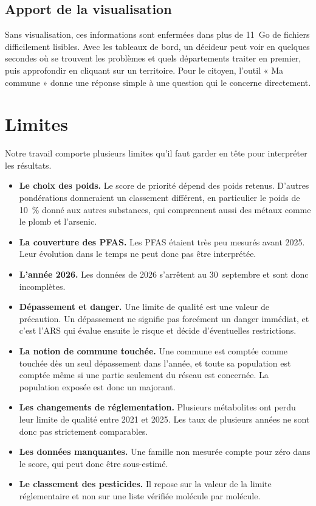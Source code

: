 \documentclass[11pt,a4paper]{article}
\begin{document}
\subsection{Apport de la visualisation}

Sans visualisation, ces informations sont enfermées dans plus de 11~Go de fichiers difficilement lisibles. Avec les tableaux de bord, un décideur peut voir en quelques secondes où se trouvent les problèmes et quels départements traiter en premier, puis approfondir en cliquant sur un territoire. Pour le citoyen, l'outil « Ma commune » donne une réponse simple à une question qui le concerne directement.

\section{Limites}

Notre travail comporte plusieurs limites qu'il faut garder en tête pour interpréter les résultats.

\begin{itemize}
  \item \textbf{Le choix des poids.} Le score de priorité dépend des poids retenus. D'autres pondérations donneraient un classement différent, en particulier le poids de 10~\% donné aux autres substances, qui comprennent aussi des métaux comme le plomb et l'arsenic.
  \item \textbf{La couverture des PFAS.} Les PFAS étaient très peu mesurés avant 2025. Leur évolution dans le temps ne peut donc pas être interprétée.
  \item \textbf{L'année 2026.} Les données de 2026 s'arrêtent au 30~septembre et sont donc incomplètes.
  \item \textbf{Dépassement et danger.} Une limite de qualité est une valeur de précaution. Un dépassement ne signifie pas forcément un danger immédiat, et c'est l'ARS qui évalue ensuite le risque et décide d'éventuelles restrictions.
  \item \textbf{La notion de commune touchée.} Une commune est comptée comme touchée dès un seul dépassement dans l'année, et toute sa population est comptée même si une partie seulement du réseau est concernée. La population exposée est donc un majorant.
  \item \textbf{Les changements de réglementation.} Plusieurs métabolites ont perdu leur limite de qualité entre 2021 et 2025. Les taux de plusieurs années ne sont donc pas strictement comparables.
  \item \textbf{Les données manquantes.} Une famille non mesurée compte pour zéro dans le score, qui peut donc être sous-estimé.
  \item \textbf{Le classement des pesticides.} Il repose sur la valeur de la limite réglementaire et non sur une liste vérifiée molécule par molécule.
\end{itemize}
\end{document}
